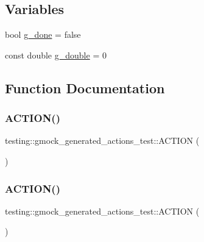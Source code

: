\subsection*{Variables}
\begin{DoxyCompactItemize}
\item 
bool \mbox{\hyperlink{namespacetesting_1_1gmock__generated__actions__test_a5f828d39e27f0615498d5aa31c96916e}{g\+\_\+done}} = false
\item 
const double \mbox{\hyperlink{namespacetesting_1_1gmock__generated__actions__test_aa10d8101300a51dd20ab028fa9971313}{g\+\_\+double}} = 0
\end{DoxyCompactItemize}


\subsection{Function Documentation}
\mbox{\label{namespacetesting_1_1gmock__generated__actions__test_a1275b0757e9f1caf70fbc23da141acd3}} 
\subsubsection{\texorpdfstring{ACTION()}{ACTION()}\hspace{0.1cm}{\footnotesize\ttfamily [1/12]}}
{\footnotesize\ttfamily testing\+::gmock\+\_\+generated\+\_\+actions\+\_\+test\+::\+A\+C\+T\+I\+ON (\begin{DoxyParamCaption}\item[{Return5}]{ }\end{DoxyParamCaption})}

\mbox{\label{namespacetesting_1_1gmock__generated__actions__test_a960f5a5ca2b6a95ce1f3f1673b90d02d}} 
\subsubsection{\texorpdfstring{ACTION()}{ACTION()}\hspace{0.1cm}{\footnotesize\ttfamily [2/12]}}
{\footnotesize\ttfamily testing\+::gmock\+\_\+generated\+\_\+actions\+\_\+test\+::\+A\+C\+T\+I\+ON (\begin{DoxyParamCaption}\item[{Increment\+Arg1}]{ }\end{DoxyParamCaption})}

